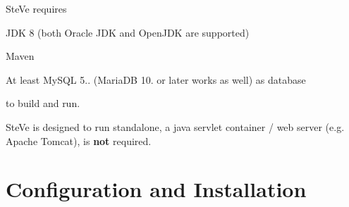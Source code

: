 Ste\+Ve requires
\begin{DoxyItemize}
\item J\+D\+K 8 (both Oracle J\+D\+K and Open\+J\+D\+K are supported)
\item Maven
\item At least My\+S\+Q\+L 5.. (Maria\+D\+B 10. or later works as well) as database
\end{DoxyItemize}

to build and run.

Ste\+Ve is designed to run standalone, a java servlet container / web server (e.\+g. Apache Tomcat), is {\bfseries not} required.

\section*{Configuration and Installation}


